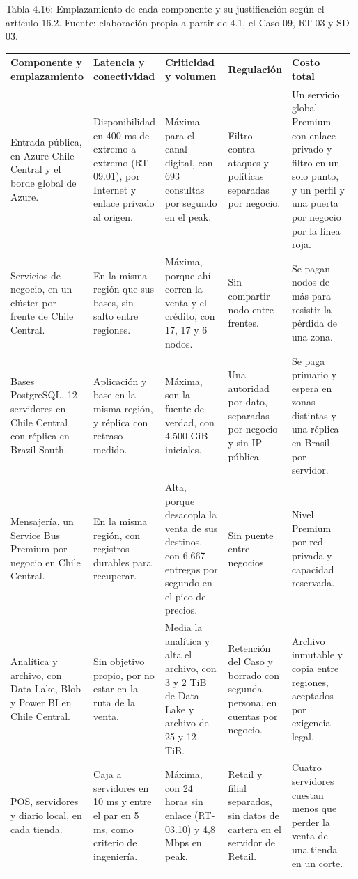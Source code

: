 \documentclass[11pt]{article}
\begin{document}
Tabla 4.16: Emplazamiento de cada componente y su justificación según el artículo 16.2. Fuente: elaboración propia a partir de 4.1, el Caso 09, RT-03 y SD-03.\par\nopagebreak
\begin{longtable}{@{}p{0.22\linewidth}p{0.19\linewidth}p{0.19\linewidth}p{0.18\linewidth}p{0.20\linewidth}@{}}
\toprule Componente y emplazamiento & Latencia y conectividad & Criticidad y volumen & Regulación & Costo total \\
\midrule\endhead\bottomrule\endlastfoot
Entrada pública, en Azure Chile Central y el borde global de Azure. & Disponibilidad en 400 ms de extremo a extremo (RT-09.01), por Internet y enlace privado al origen. & Máxima para el canal digital, con 693 consultas por segundo en el peak. & Filtro contra ataques y políticas separadas por negocio. & Un servicio global Premium con enlace privado y filtro en un solo punto, y un perfil y una puerta por negocio por la línea roja. \\
Servicios de negocio, en un clúster por frente de Chile Central. & En la misma región que sus bases, sin salto entre regiones. & Máxima, porque ahí corren la venta y el crédito, con 17, 17 y 6 nodos. & Sin compartir nodo entre frentes. & Se pagan nodos de más para resistir la pérdida de una zona. \\
Bases PostgreSQL, 12 servidores en Chile Central con réplica en Brazil South. & Aplicación y base en la misma región, y réplica con retraso medido. & Máxima, son la fuente de verdad, con 4.500 GiB iniciales. & Una autoridad por dato, separadas por negocio y sin IP pública. & Se paga primario y espera en zonas distintas y una réplica en Brasil por servidor. \\
Mensajería, un Service Bus Premium por negocio en Chile Central. & En la misma región, con registros durables para recuperar. & Alta, porque desacopla la venta de sus destinos, con 6.667 entregas por segundo en el pico de precios. & Sin puente entre negocios. & Nivel Premium por red privada y capacidad reservada. \\
Analítica y archivo, con Data Lake, Blob y Power BI en Chile Central. & Sin objetivo propio, por no estar en la ruta de la venta. & Media la analítica y alta el archivo, con 3 y 2 TiB de Data Lake y archivo de 25 y 12 TiB. & Retención del Caso y borrado con segunda persona, en cuentas por negocio. & Archivo inmutable y copia entre regiones, aceptados por exigencia legal. \\
POS, servidores y diario local, en cada tienda. & Caja a servidores en 10 ms y entre el par en 5 ms, como criterio de ingeniería. & Máxima, con 24 horas sin enlace (RT-03.10) y 4,8 Mbps en peak. & Retail y filial separados, sin datos de cartera en el servidor de Retail. & Cuatro servidores cuestan menos que perder la venta de una tienda en un corte. \\

\end{longtable}
\end{document}
